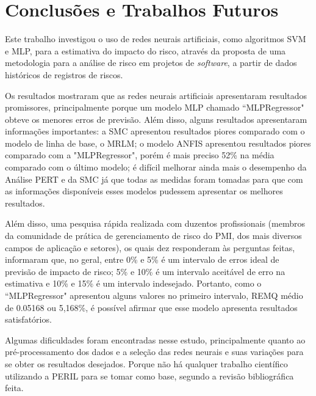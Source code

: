 \chapter{Conclusões e Trabalhos Futuros}\label{cap:conclusion}

Este trabalho investigou o uso de redes neurais artificiais, como algoritmos SVM e MLP, para a estimativa do impacto do risco, através da proposta de uma metodologia para a análise de risco em projetos de \textit{software}, a partir de dados históricos de registros de riscos. 

Os resultados mostraram que as redes neurais artificiais apresentaram resultados promissores, principalmente porque um modelo MLP chamado ``MLPRegressor" obteve os menores erros de previsão. Além disso, alguns resultados apresentaram informações importantes: a SMC apresentou resultados piores comparado com o modelo de linha de base, o MRLM; o modelo ANFIS apresentou resultados piores comparado com a "MLPRegressor", porém é mais preciso 52\% na média comparado com o último modelo; é difícil melhorar ainda mais o desempenho da Análise PERT e da SMC já que todas as medidas foram tomadas para que com as informações disponíveis esses modelos pudessem apresentar os melhores resultados.

Além disso, uma pesquisa rápida realizada com duzentos profissionais (membros da comunidade de prática de gerenciamento de risco do PMI, dos mais diversos campos de aplicação e setores), os quais dez responderam às perguntas feitas, informaram que, no geral, entre 0\% e 5\% é um intervalo de erros ideal de previsão de impacto de risco; 5\% e 10\% é um intervalo aceitável de erro na estimativa e 10\% e 15\% é um intervalo indesejado. Portanto, como o ``MLPRegressor" apresentou alguns valores no primeiro intervalo, REMQ médio de 0.05168 ou 5,168\%, é possível afirmar que esse modelo apresenta resultados satisfatórios.

Algumas dificuldades foram encontradas nesse estudo, principalmente quanto ao pré-processamento dos dados e a seleção das redes neurais e suas variações para se obter os resultados desejados. Porque não há qualquer trabalho científico utilizando a PERIL para se tomar como base, segundo a revisão bibliográfica feita.

